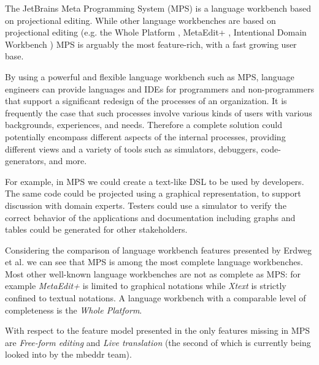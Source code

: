 \documentclass[preprint,numbers,10pt]{sigplanconf}
\newcommand\markus[1]{\textcolor{red}{MARKUS: {#1}}}
\newcommand\ana[1]{\textcolor{red}{ANA: {#1}}}
\begin{document}
The JetBrains Meta Programming System (MPS) is a language workbench based
on projectional editing. While other language workbenches are based on
projectional editing (e.g. the Whole Platform \cite{solmi2005whole}, MetaEdit+
\cite{Tolvanen2006}, Intentional Domain Workbench \cite{Simonyi2006}) MPS is
arguably the most feature-rich, with a fast growing user base.

By using a powerful and flexible language workbench such as MPS, language
engineers can provide languages and IDEs for programmers and non-programmers that support a significant redesign of the processes of an organization.
It is frequently the case that such processes involve various kinds of users with various backgrounds, experiences, and needs. Therefore a complete solution
could potentially encompass different aspects of the internal processes,
providing different views and a variety of tools such as simulators, debuggers,
code-generators, and more.

For example, in MPS we could create a text-like DSL to be used by developers. The same code could be projected using a graphical representation, to support discussion with domain experts. Testers could use a simulator to verify the correct behavior of the applications and documentation including graphs and tables could be generated for other stakeholders.


Considering the comparison of language workbench features presented by Erdweg et al.
\cite{erdweg2015evaluating} we can see that MPS is among the most complete
language workbenches. Most other well-known language workbenches are not as complete as MPS: for example \emph{MetaEdit+} is limited to graphical notations while \emph{Xtext} \cite{Eysholdt2010} is strictly confined to textual notations. A language workbench with a comparable level of completeness is the \emph{Whole
Platform}.

With respect to the feature model presented in \cite{erdweg2015evaluating} the
only features missing in MPS are \emph{Free-form editing} and \emph{Live
translation} (the second of which is currently being looked into by the mbeddr team).

%
\end{document}
